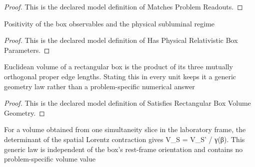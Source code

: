 \begin{proof}
  This is the declared model definition of Matches Problem Readouts.
\end{proof}
\begin{definition}
  \label{def:physics:phyx-mini-0559:phyxminiproblems-problemphyxmini0559-hasphysicalrelativisticboxparameters}
  Positivity of the box observables and the physical subluminal regime
\end{definition}
\begin{proof}
  This is the declared model definition of Has Physical Relativistic Box Parameters.
\end{proof}
\begin{definition}
  \label{def:physics:phyx-mini-0559:phyxminiproblems-problemphyxmini0559-satisfiesrectangularboxvolumegeometry}
  Euclidean volume of a rectangular box is the product of its three mutually orthogonal proper edge lengths. Stating this in every unit keeps it a generic geometry law rather than a problem-specific numerical answer
\end{definition}
\begin{proof}
  This is the declared model definition of Satisfies Rectangular Box Volume Geometry.
\end{proof}
\begin{definition}
  \label{def:physics:phyx-mini-0559:phyxminiproblems-problemphyxmini0559-satisfiesspecialrelativisticvolumecontraction}
  For a volume obtained from one simultaneity slice in the laboratory frame, the determinant of the spatial Lorentz contraction gives V\_S = V\_S' / γ(β). This generic law is independent of the box's rest-frame orientation and contains no problem-specific volume value
\end{definition}
